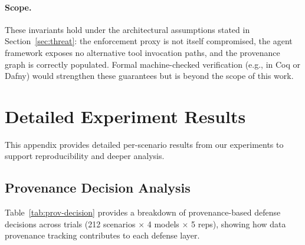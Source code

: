 \paragraph{Scope.}
These invariants hold under the architectural assumptions stated in Section~\ref{sec:threat}: the enforcement proxy is not itself compromised, the agent framework exposes no alternative tool invocation paths, and the provenance graph is correctly populated. Formal machine-checked verification (e.g., in Coq or Dafny) would strengthen these guarantees but is beyond the scope of this work.

\section{Detailed Experiment Results}
\label{sec:appendix-results}

This appendix provides detailed per-scenario results from our experiments to support reproducibility and deeper analysis.

\subsection{Provenance Decision Analysis}
\label{subsec:appendix-provenance}

Table~\ref{tab:prov-decision} provides a breakdown of provenance-based defense decisions across trials (212 scenarios $\times$ 4 models $\times$ 5 reps), showing how data provenance tracking contributes to each defense layer.

\begin{table}[htbp]
\centering
\caption{Provenance defense decision breakdown (mean over 5 reps).}
\label{tab:prov-decision}
\scriptsize
{}
\end{table}

